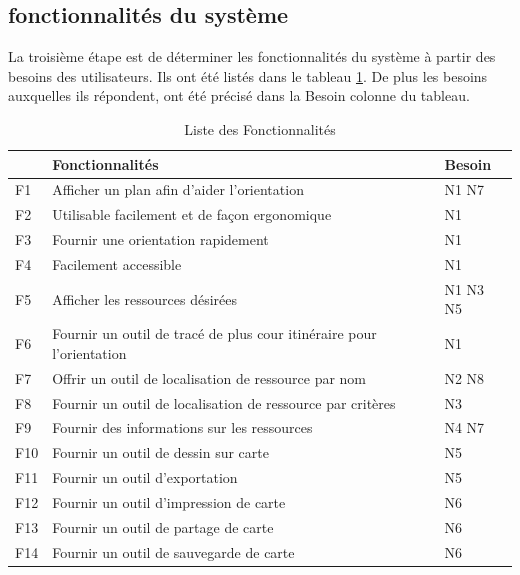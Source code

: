 \documentclass[
    iai, %
    il, %
]{heig-tb}
\begin{document}
\newpage

\subsection{fonctionnalités du système}
La troisième étape est de déterminer les fonctionnalités du système à partir des besoins des utilisateurs.
Ils ont été listés dans le tableau \ref{fonctions}.
De plus les besoins auxquelles ils répondent, ont été précisé dans la Besoin colonne du tableau.
\begin{table}[h]
    \begin{center}
        \caption{Liste des Fonctionnalités \label{fonctions}}
        \begin{tabular}{l|l|l}
                & Fonctionnalités                                                      & Besoin   \\ \hline
            F1  & Afficher un plan afin d'aider l'orientation                          & N1 N7    \\
            F2  & Utilisable facilement et de façon ergonomique                        & N1       \\
            F3  & Fournir une orientation rapidement                                   & N1       \\
            F4  & Facilement accessible                                                & N1       \\
            F5  & Afficher les ressources désirées                                     & N1 N3 N5 \\
            F6  & Fournir un outil de tracé de plus cour itinéraire pour l'orientation & N1       \\
            F7  & Offrir un outil de localisation de ressource par nom                 & N2 N8    \\
            F8  & Fournir un outil de localisation de ressource par critères           & N3       \\
            F9  & Fournir des informations sur les ressources                          & N4 N7    \\
            F10 & Fournir un outil de dessin sur carte                                 & N5       \\
            F11 & Fournir un outil d'exportation                                       & N5       \\
            F12 & Fournir un outil d'impression de carte                               & N6       \\
            F13 & Fournir un outil de partage de carte                                 & N6       \\
            F14 & Fournir un outil de sauvegarde de carte                              & N6
        \end{tabular}
    \end{center}
\end{table}
\end{document}
